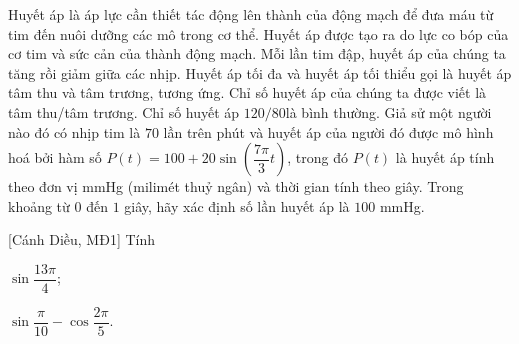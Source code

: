 \begin{bt}%
	Huyết áp là áp lực cần thiết tác động lên thành của động mạch để đưa máu từ tim đến nuôi dưỡng các mô trong cơ thể. Huyết áp được tạo ra do lực co bóp của cơ tim và sức cản của thành động mạch. Mỗi lần tim đập, huyết áp của chúng ta tăng rồi giảm giữa các nhịp. Huyết áp tối đa và huyết áp tối thiểu gọi là huyết áp tâm thu và tâm trương, tương ứng. Chỉ số huyết áp của chúng ta được viết là tâm thu/tâm trương. Chỉ số huyết áp $120 / 80 $là bình thường. Giả sử một người nào đó có nhịp tim là $70$ lần trên phút và huyết áp của người đó được mô hình hoá bởi hàm số $P(t)=100+20\sin \left(\dfrac{7\pi}{3}t\right)$, trong đó $P(t)$ là huyết áp tính theo đơn vị mmHg (milimét thuỷ ngân) và thời gian tính theo giây. Trong khoảng từ $0$ đến $1$ giây, hãy xác định số lần huyết áp là $100$ mmHg.
\end{bt}

\begin{bt}%
[Cánh Diều, MĐ1]
	Tính 
	\begin{listEX}[2]
		\item $\sin \dfrac{13\pi}{4}$;
		\item $\sin \dfrac{\pi}{10}-\cos \dfrac{2\pi}{5}$.
	\end{listEX}
\end{bt}

